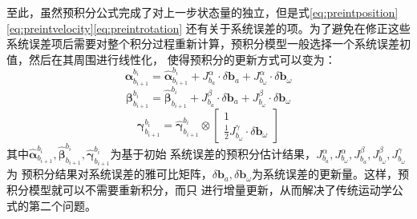至此，虽然预积分公式完成了对上一步状态量的独立，但是式\eqref{eq:preintposition}\eqref{eq:preintvelocity}\eqref{eq:preintrotation}
还有关于系统误差的项。为了避免在修正这些系统误差项后需要对整个积分过程重新计算，预积分模型一般选择一个系统误差初值，然后在其周围进行线性化，
使得预积分的更新方式可以变为：
\begin{equation}
  \symbf{\alpha}_{b_{i+1}}^{b_i} = \hat{\symbf{\alpha}}_{b_{i+1}}^{b_i} + J^{\alpha}_{b_a} \cdot \delta \symbf{b}_a + J^{\alpha}_{b_{\omega}} \cdot \delta \symbf{b}_{\omega}
\end{equation}
\begin{equation}
  \symbf{\beta}_{b_{i+1}}^{b_i} = \hat{\symbf{\beta}}_{b_{i+1}}^{b_i} + J^{\beta}_{b_a} \cdot \delta \symbf{b}_a + J^{\beta}_{b_{\omega}} \cdot \delta \symbf{b}_{\omega}
\end{equation}
\begin{equation}
  \symbf{\gamma}_{b_{i+1}}^{b_i} = \hat{\symbf{\gamma}}_{b_{i+1}}^{b_i} \otimes \begin{bmatrix}
    1 \\ \frac12 J^{\gamma}_{b_{\omega}} \cdot \delta \symbf{b}_{\omega}
  \end{bmatrix}
\end{equation}
其中$\hat{\symbf{\alpha}}_{b_{i+1}}^{b_i},\hat{\symbf{\beta}}_{b_{i+1}}^{b_i},\hat{\symbf{\gamma}}_{b_{i+1}}^{b_i}$为基于初始
系统误差的预积分估计结果，$J^{\alpha}_{b_a},J^{\alpha}_{b_{\omega}},J^{\beta}_{b_a},J^{\beta}_{b_{\omega}},J^{\gamma}_{b_{\omega}}$为
预积分结果对系统误差的雅可比矩阵，$\delta \symbf{b}_a,\delta \symbf{b}_{\omega}$为系统误差的更新量。这样，预积分模型就可以不需要重新积分，而只
进行增量更新，从而解决了传统运动学公式的第二个问题。